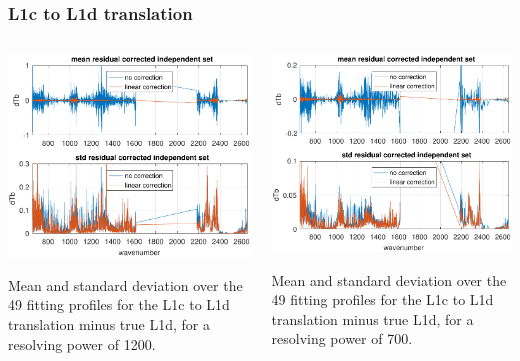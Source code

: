 \documentclass[10pt]{beamer}
\begin{document}
\begin{frame}
\frametitle{L1c to L1d translation}
\begin{columns}[t]
\begin{column}{0.5\textwidth}
  \begin{centering}
  \includegraphics[width=\textwidth]{figures/L1d_cor1_1200.pdf}
  \end{centering}\vspace{3mm}
  Mean and standard deviation over the 49 fitting profiles for the
  L1c to L1d translation minus true L1d, for a resolving power of
  1200.

\end{column}
\begin{column}{0.5\textwidth}  
  \begin{centering}
  \includegraphics[width=\textwidth]{figures/L1d_cor1_700.pdf}
  \end{centering}\vspace{3mm}
  Mean and standard deviation over the 49 fitting profiles for the
  L1c to L1d translation minus true L1d, for a resolving power of
  700.
 
\end{column}
\end{columns}
\end{frame}
\end{document}
